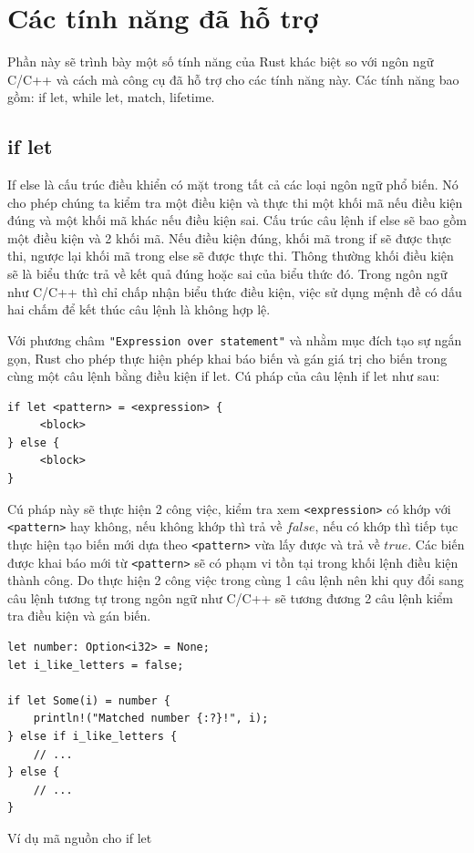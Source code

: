 \section{Các tính năng đã hỗ trợ}

Phần này sẽ trình bày một số tính năng của Rust khác biệt so với ngôn ngữ C/C++ và cách mà công cụ đã hỗ trợ cho các tính năng này.
Các tính năng bao gồm: if let, while let, match, lifetime.

\subsection{if let}
If else là cấu trúc điều khiển có mặt trong tất cả các loại ngôn ngữ phổ biến.
Nó cho phép chúng ta kiểm tra một điều kiện và thực thi một khối mã nếu điều kiện đúng và một khối mã khác nếu điều kiện sai.
Cấu trúc câu lệnh if else sẽ bao gồm một điều kiện và 2 khối mã.
Nếu điều kiện đúng, khối mã trong if sẽ được thực thi, ngược lại khối mã trong else sẽ được thực thi.
Thông thường khối điều kiện sẽ là biểu thức trả về kết quả đúng hoặc sai của biểu thức đó.
Trong ngôn ngữ như C/C++ thì chỉ chấp nhận biểu thức điều kiện, việc sử dụng mệnh đề có dấu hai chấm để kết thúc câu lệnh là không hợp lệ.

Với phương châm \texttt{"Expression over statement"} và nhằm mục đích tạo sự ngắn gọn, Rust cho phép thực hiện phép khai báo biến và gán giá trị cho biến trong cùng một câu lệnh bằng điều kiện if let.
Cú pháp của câu lệnh if let như sau:

\begin{verbatim}
if let <pattern> = <expression> {
     <block>
} else {
     <block>
}
\end{verbatim}


Cú pháp này sẽ thực hiện 2 công việc, kiểm tra xem \texttt{<expression>} có khớp với \texttt{<pattern>} hay không, nếu không khớp thì trả về $false$, nếu có khớp thì tiếp tục thực hiện tạo biến mới dựa theo \texttt{<pattern>} vừa lấy được và trả về $true$.
Các biến được khai báo mới từ \texttt{<pattern>} sẽ có phạm vi tồn tại trong khối lệnh điều kiện thành công.
Do thực hiện 2 công việc trong cùng 1 câu lệnh nên khi quy đổi sang câu lệnh tương tự trong ngôn ngữ như C/C++ sẽ tương đương 2 câu lệnh kiểm tra điều kiện và gán biến.

\begin{listing}[H]
\begin{verbatim}
let number: Option<i32> = None;
let i_like_letters = false;

if let Some(i) = number {
    println!("Matched number {:?}!", i);
} else if i_like_letters {
    // ...
} else {
    // ...
}
\end{verbatim}
\caption{Ví dụ mã nguồn cho if let}
\label{code:c4_iflet}
\end{listing}

